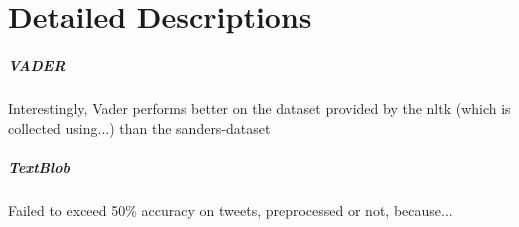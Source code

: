 \chapter{Detailed Descriptions}
\label{chapter:DetailedDescriptions}\label{sentimentanalysis}
\paragraph{VADER}
Interestingly, Vader performs better on the dataset provided by the nltk (which is collected using...) than the sanders-dataset

\paragraph{TextBlob}
Failed to exceed 50\% accuracy on tweets, preprocessed or not, because...


\newpage
